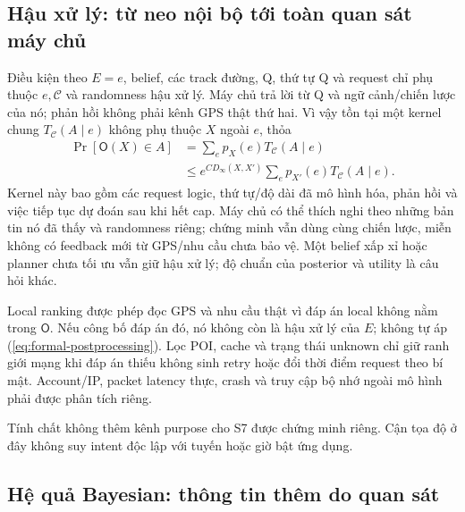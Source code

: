 \subsection{Hậu xử lý: từ neo nội bộ tới toàn quan sát máy chủ}
\label{sec:formal-server-postprocessing}

Điều kiện theo $E=e$, belief, các track đường, Q, thứ tự Q và request chỉ
phụ thuộc $e,\mathcal C$ và randomness hậu xử lý. Máy chủ trả lời từ Q và
ngữ cảnh/chiến lược của nó; phản hồi không phải kênh GPS thật thứ hai. Vì
vậy tồn tại một kernel chung $T_{\mathcal C}(A\mid e)$ không phụ thuộc
$X$ ngoài $e$, thỏa
\begin{equation}
 \begin{split}
 \Pr[\mathsf O(X)\in A]
 &=\sum_e p_X(e)T_{\mathcal C}(A\mid e)\\
 &\leq e^{CD_\infty(X,X')}
       \sum_e p_{X'}(e)T_{\mathcal C}(A\mid e).
 \end{split}
 \label{eq:formal-postprocessing}
\end{equation}
Kernel này bao gồm các request logic, thứ tự/độ dài đã mô hình hóa, phản
hồi và việc tiếp tục dự đoán sau khi hết cap. Máy chủ có thể thích nghi theo
những bản tin nó đã thấy và randomness riêng; chứng minh vẫn dùng cùng
chiến lược, miễn không có feedback mới từ GPS/nhu cầu chưa bảo vệ. Một
belief xấp xỉ hoặc planner chưa tối ưu vẫn giữ hậu xử lý; độ chuẩn của
posterior và utility là câu hỏi khác.

Local ranking được phép đọc GPS và nhu cầu thật vì đáp án local không nằm
trong $\mathsf O$. Nếu công bố đáp án đó, nó không còn là hậu xử lý của
$E$; không tự áp (\ref{eq:formal-postprocessing}). Lọc POI, cache và trạng
thái unknown chỉ giữ ranh giới mạng khi đáp án thiếu không sinh retry hoặc
đổi thời điểm request theo bí mật. Account/IP, packet latency thực, crash
và truy cập bộ nhớ ngoài mô hình phải được phân tích riêng.

Tính chất không thêm kênh purpose cho S7 được chứng minh riêng. Cận tọa độ
ở đây không suy intent độc lập với tuyến hoặc giờ bật ứng dụng.

\subsection{Hệ quả Bayesian: thông tin thêm do quan sát}
\label{sec:formal-bayesian-odds}

